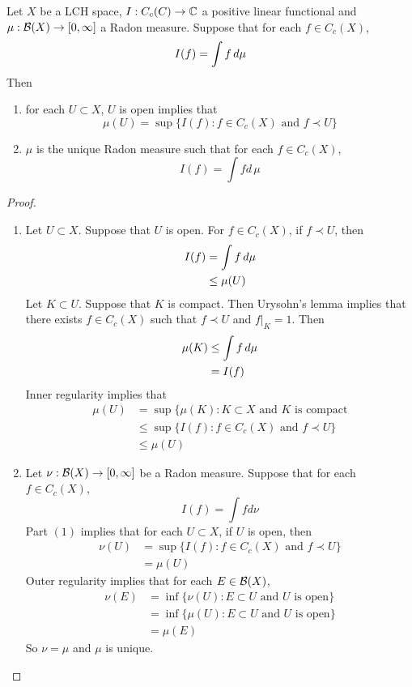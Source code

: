 \documentclass{book}
\begin{document}
	\begin{ex}  
	Let $X$ be a LCH space, $I: C_c(C) \rightarrow \mathbb{C}$ a positive linear functional and $\mu:\mathcal{B}(X) \rightarrow [0,\infty]$ a Radon measure. Suppose that for each $f \in C_c(X)$, $$I(f) = \int f \, d \mu$$
	Then 
	\begin{enumerate}
	\item for each $U \subset X$, $U$ is open implies that $$\mu(U) = \sup \{I(f): f \in C_c(X) \text{ and } f \prec U \}$$ 
	\item $\mu$ is the unique Radon measure such that for each $f \in C_c(X)$, $$I(f) = \int f d \, \mu$$
\end{enumerate}	 
	\end{ex}
	
	\begin{proof}\
	\begin{enumerate}
	\item Let $U \subset X$. Suppose that $U$ is open. For $f \in C_c(X)$, if $f \prec U$, then 
	\begin{align*}
	I(f) 
	&= \int f \, d \mu \\
	& \leq \mu(U) 
	\end{align*}
	Let $K \subset U$. Suppose that $K$ is compact. Then Urysohn's lemma implies that there exists $f \in C_c(X)$ such that $f \prec U$ and $f|_K = 1$. Then 
	\begin{align*}
	\mu(K) 
	&\leq \int f \, d \mu \\
	&= I(f)
	\end{align*}
	Inner regularity implies that 
	\begin{align*}
	\mu(U) 
	&= \sup \{\mu(K): K \subset X \text{ and $K$ is compact} \\
	& \leq \sup \{I(f): f \in C_c(X) \text{ and } f \prec U \} \\
	&\leq \mu(U)
	\end{align*}
	\item Let $\nu: \mathcal{B}(X) \rightarrow [0,\infty]$ be a Radon measure. Suppose that for each $f \in C_c(X)$, $$I(f) = \int f d\nu$$
	Part $(1)$ implies that for each $U \subset X$, if $U$ is open, then 
	\begin{align*}
	\nu(U) 
	&= \sup \{I(f): f \in C_c(X) \text{ and } f \prec U \} \\
	&= \mu(U)
\end{align*}		
	Outer regularity implies that for each $E \in \mathcal{B}(X)$, 
	\begin{align*}
	\nu(E) 
	&= \inf \{\nu(U): E \subset U \text{ and $U$ is open}\} \\
	&= \inf \{\mu(U): E \subset U \text{ and $U$ is open}\} \\
	&= \mu(E)
	\end{align*}
	So $\nu = \mu$ and $\mu$ is unique.
\end{enumerate}		  
	\end{proof}
	
\end{document}
